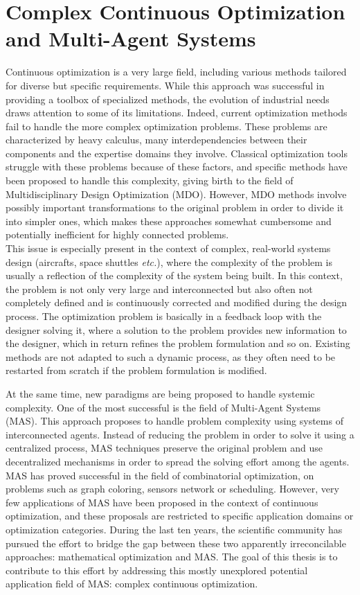 \label{introduction}

\section*{Complex Continuous Optimization and Multi-Agent Systems}

Continuous optimization is a very large field, including various methods tailored for diverse but specific requirements. While this approach was successful in providing a toolbox of specialized methods, the evolution of industrial needs draws attention to some of its limitations. Indeed, current optimization methods fail to handle the more complex optimization problems. These problems are characterized by heavy calculus, many interdependencies between their components and the expertise domains they involve. Classical optimization tools struggle with these problems because of these factors, and specific methods have been proposed to handle this complexity, giving birth to the field of Multidisciplinary Design Optimization (MDO). However, MDO methods involve possibly important transformations to the original problem in order to divide it into simpler ones, which makes these approaches somewhat cumbersome and potentially inefficient for highly connected problems.\\
This issue is especially present in the context of complex, real-world systems design (aircrafts, space shuttles \emph{etc.}), where the complexity of the problem is usually a reflection of the complexity of the system being built. In this context, the problem is not only very large and interconnected but also often not completely defined and is continuously corrected and modified during the design process. The optimization problem is basically in a feedback loop with the designer solving it, where a solution to the problem provides new information to the designer, which in return refines the problem formulation and so on. Existing methods are not adapted to such a dynamic process, as they often need to be restarted from scratch if the problem formulation is modified.

At the same time, new paradigms are being proposed to handle systemic complexity. One of the most successful is the field of Multi-Agent Systems (MAS). This approach proposes to handle problem complexity using systems of interconnected agents. Instead of reducing the problem in order to solve it using a centralized process, MAS techniques preserve the original problem and use decentralized mechanisms in order to spread the solving effort among the agents. MAS has proved successful in the field of combinatorial optimization, on problems such as graph coloring, sensors network or scheduling. However, very few applications of MAS have been proposed in the context of continuous optimization, and these proposals are restricted to specific application domains or optimization categories.
\newpage
During the last ten years, the scientific community has pursued the effort to bridge the gap between these two apparently irreconcilable approaches: mathematical optimization and MAS. The goal of this thesis is to contribute to this effort by addressing this mostly unexplored potential application field of MAS: complex continuous optimization.

